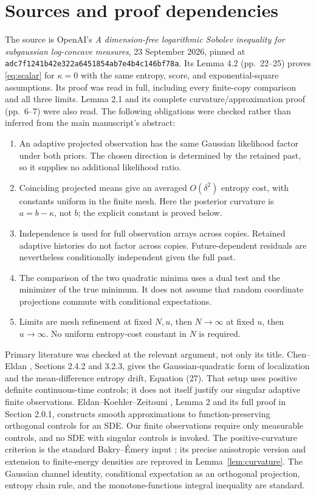 \documentclass[11pt]{article}
\theoremstyle{remark}\newtheorem{remark}[theorem]{Remark}
\begin{document}
\section{Sources and proof dependencies}
The source is OpenAI's \emph{A dimension-free logarithmic Sobolev inequality
for subgaussian log-concave measures}, 23 September 2026, pinned at
\texttt{adc7f1241b42e322a6451854ab7e4b4c146bf78a}.
Its Lemma 4.2 (pp.\ 22--25) proves \eqref{eq:scalar} for $\kappa=0$ with the
same entropy, score, and exponential-square assumptions. Its proof was read
in full, including every finite-copy comparison and all three limits.
Lemma 2.1 and its complete curvature/approximation proof (pp.\ 6--7) were also
read. The following obligations were checked rather than inferred from the
main manuscript's abstract:
\begin{enumerate}
\item An adaptive projected observation has the same Gaussian likelihood
factor under both priors. The chosen direction is determined by the retained
past, so it supplies no additional likelihood ratio.
\item Coinciding projected means give an averaged $O(\delta^2)$ entropy cost,
with constants uniform in the finite mesh. Here the posterior curvature is
$a=b-\kappa$, not $b$; the explicit constant is proved below.
\item Independence is used for full observation arrays across copies.
Retained adaptive histories do not factor across copies. Future-dependent
residuals are nevertheless conditionally independent given the full past.
\item The comparison of the two quadratic minima uses a dual test and the
minimizer of the true minimum. It does not assume that random coordinate
projections commute with conditional expectations.
\item Limits are mesh refinement at fixed $N,u$, then $N\to\infty$ at fixed
$u$, then $u\to\infty$. No uniform entropy-cost constant in $N$ is required.
\end{enumerate}

Primary literature was checked at the relevant argument, not only its title.
Chen--Eldan \cite{CE}, Sections 2.4.2 and 3.2.3, gives the Gaussian-quadratic
form of localization and the mean-difference entropy drift, Equation (27).
That setup uses positive definite continuous-time controls; it does not
itself justify our singular adaptive finite observations.
Eldan--Koehler--Zeitouni \cite{EKZ}, Lemma 2 and its full proof in
Section 2.0.1, constructs smooth approximations to function-preserving
orthogonal controls for an SDE. Our finite observations require only
measurable controls, and no SDE with singular controls is invoked.
The positive-curvature criterion is the standard Bakry--\'Emery input
\cite{BE}; its precise anisotropic version and extension to finite-energy
densities are reproved in Lemma~\ref{lem:curvature}.
The Gaussian channel identity, conditional expectation as an orthogonal
projection, entropy chain rule, and the monotone-functions integral
inequality are standard.
\end{document}
